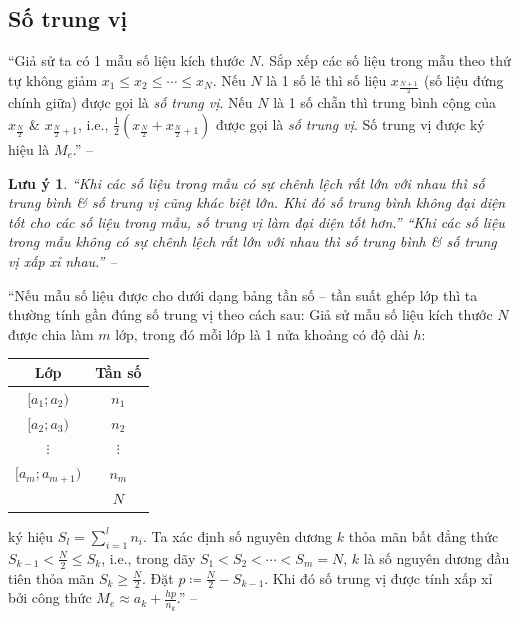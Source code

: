 \documentclass[oneside]{book}
\numberwithin{equation}{section}
\newtheorem{luuy}{Lưu ý}[section]
\begin{document}
\subsection{Số trung vị}
``Giả sử ta có 1 mẫu số liệu kích thước $N$. Sắp xếp các số liệu trong mẫu theo thứ tự không giảm $x_1\le x_2\le\cdots\le x_N$. Nếu $N$ là 1 số lẻ thì số liệu $x_{\frac{N+1}{2}}$ (số liệu đứng chính giữa) được gọi là \textit{số trung vị}. Nếu $N$ là 1 số chẵn thì trung bình cộng của $x_{\frac{N}{2}}$ \& $x_{\frac{N}{2} + 1}$, i.e., $\frac{1}{2}\left(x_{\frac{N}{2}} + x_{\frac{N}{2} + 1}\right)$ được gọi là \textit{số trung vị}. Số trung vị được ký hiệu là $M_e$.'' -- \cite[p. 70]{TL_chuyen_Toan_Dai_So_Giai_Tich_11}

\begin{luuy}
	``Khi các số liệu trong mẫu có sự chênh lệch rất lớn với nhau thì số trung bình \& số trung vị cũng khác biệt lớn. Khi đó số trung bình không đại diện tốt cho các số liệu trong mẫu, số trung vị làm đại diện tốt hơn.'' ``Khi các số liệu trong mẫu không có sự chênh lệch rất lớn với nhau thì số trung bình \& số trung vị xấp xỉ nhau.'' -- \cite[p. 71]{TL_chuyen_Toan_Dai_So_Giai_Tich_11}
\end{luuy}
``Nếu mẫu số liệu được cho dưới dạng bảng tần số -- tần suất ghép lớp thì ta thường tính gần đúng số trung vị theo cách sau: Giả sử mẫu số liệu kích thước $N$ được chia làm $m$ lớp, trong đó mỗi lớp là 1 nửa khoảng có độ dài $h$:

\begin{table}[H]
	\centering
	\begin{tabular}{|c|c|}
		\hline
		Lớp & Tần số \\
		\hline
		$[a_1;a_2)$ & $n_1$ \\
		\hline
		$[a_2;a_3)$ & $n_2$ \\
		\hline
		$\vdots$ & $\vdots$ \\
		\hline
		$[a_m;a_{m+1})$ & $n_m$ \\
		\hline
		& $N$ \\
		\hline
	\end{tabular}
\end{table}
ký hiệu $S_l = \sum_{i=1}^l n_i$. Ta xác định số nguyên dương $k$ thỏa mãn bất đẳng thức $S_{k-1} < \frac{N}{2}\le S_k$, i.e., trong dãy $S_1 < S_2 < \cdots < S_m = N$, $k$ là số nguyên dương đầu tiên thỏa mãn $S_k\ge\frac{N}{2}$. Đặt $p\coloneqq\frac{N}{2} - S_{k-1}$. Khi đó số trung vị được tính xấp xỉ bởi công thức $M_e\approx a_k + \frac{hp}{n_k}$.'' -- \cite[pp. 71--72]{TL_chuyen_Toan_Dai_So_Giai_Tich_11}
\end{document}
